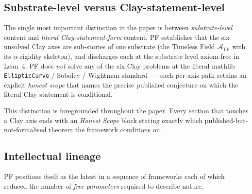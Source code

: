 \documentclass[11pt,a4paper]{article}
\theoremstyle{definition}
\theoremstyle{remark}
\newcommand{\TF}{\mathcal{A}_{\mathrm{TF}}}
\begin{document}
\subsection{Substrate-level versus Clay-statement-level}

The single most important distinction in the paper is between
\emph{substrate-level} content and \emph{literal Clay-statement-form}
content. PF establishes that the six unsolved Clay axes are
sub-stories of one substrate (the Timeless Field
$\TF$ with its $\alpha$-rigidity skeleton), and discharges each at
the substrate level axiom-free in Lean~4. PF does \emph{not} solve
any of the six Clay problems at the literal mathlib
\texttt{EllipticCurve} / Sobolev / Wightman standard~--- each
per-axis path retains an explicit \emph{honest scope} that names
the precise published conjecture on which the literal Clay
statement is conditional.

This distinction is foregrounded throughout the paper. Every
section that touches a Clay axis ends with an \emph{Honest Scope}
block stating exactly which published-but-not-formalised theorem
the framework conditions on.

\subsection{Intellectual lineage}

PF positions itself as the latest in a sequence of frameworks each
of which reduced the number of \emph{free parameters} required to
describe nature.
\end{document}
